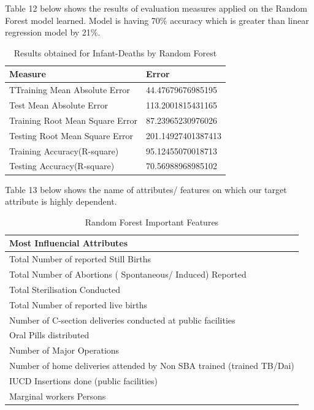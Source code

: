 \documentclass[12pt]{article}
\begin{document}
Table 12 below shows the results of evaluation measures applied on the Random Forest model learned. Model is having 70\% accuracy which is greater than linear regression model by 21\%. 
\begin{table}[!h]
\centering
\caption{Results obtained for Infant-Deaths by Random Forest}
\vspace{5pt}
\begin{tabular}{|l|l|}
\hline
\textbf{Measure}                & \textbf{Error}   \\ \hline
TTraining Mean Absolute Error    & 44.47679676985195  \\
Test Mean Absolute Error        & 113.2001815431165  \\
Training Root Mean Square Error & 87.23965230976026  \\
Testing Root Mean Square Error  & 201.14927401387413 \\
Training Accuracy(R-square)     & 95.12455070018713  \\
Testing Accuracy(R-square)      & 70.56988968985102	\\ \hline
\end{tabular}
\end{table}

Table 13 below shows the name of attributes/ features on which our target attribute is highly dependent.\\

\begin{table}[h]
\centering
\caption{Random Forest Important Features}
\vspace{5pt}
\begin{tabular}{|l|}
\hline
\textbf{Most Influencial Attributes}                                   \\ \hline
Total Number of reported Still Births                                  \\
Total Number of Abortions ( Spontaneous/ Induced) Reported             \\
Total Sterilisation Conducted                                          \\
Total Number of reported live births                                   \\
Number of C-section deliveries conducted at public facilities          \\
Oral Pills distributed                                                 \\
Number of Major Operations                                             \\
Number of home deliveries attended by Non SBA trained (trained TB/Dai) \\
IUCD Insertions done (public facilities)                               \\
Marginal workers Persons           \\ \hline                                   
\end{tabular}
\end{table}
\end{document}

